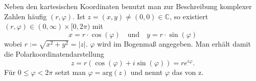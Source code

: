 Neben den kartesischen Koordinaten benutzt man zur Beschreibung komplexer Zahlen häufig  $(r, \varphi)$.
Ist $z = (x, y) \neq (0, 0) \in \mathbb{C}$, so existiert $(r, \varphi) \in (0, \infty) \times [0, 2 \pi)$ mit
$$x = r \cdot \cos(\varphi) \quad \text{und} \quad y = r \cdot \sin(\varphi)$$
wobei $r := \sqrt{x^2+y^2} = |z|$. $\varphi$ wird im Bogenmaß angegeben. Man erhält damit die Polarkoordinatendarstellung
$$z = r(\cos(\varphi) + i \sin(\varphi)) = re^{i\varphi}.$$
Für $0 \leq \varphi < 2 \pi$ setzt man $\varphi = \text{arg}(z)$ und nennt $\varphi$ das  von z.